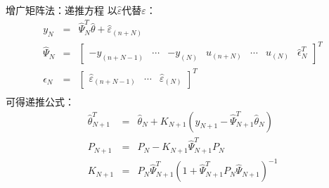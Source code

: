 \begin{frame}{增广矩阵法：递推方程}
以$\hat\varepsilon$代替$\varepsilon$：
\begin{eqnarray*}
y_{N} &=& \hat \Psi_N^T\hat\theta +\hat\varepsilon_{(n+N)} \\
\hat\Psi_N &=&\begin{bmatrix}-y_{(n+N-1)} & \cdots & -y_{(N)} & u_{(n+N)} &\cdots & u_{(N)} & \hat\epsilon_N^T \end{bmatrix}^T \\
\hat\epsilon_N &=&\begin{bmatrix} \hat\varepsilon_{(n+N-1)} & \cdots & \hat\varepsilon_{(N)} \end{bmatrix}^T \\
\end{eqnarray*}
可得递推公式：
\begin{eqnarray*}
\hat\theta_{N+1}^T &=& \hat\theta_N + K_{N+1} (y_{N+1}-\hat\Psi_{N+1}^T\hat\theta_N) \\
P_{N+1} &=& P_N -K_{N+1}\hat\Psi_{N+1}^T P_N \\
K_{N+1} &=& P_N \hat\Psi_{N+1}^T (1+\hat\Psi_{N+1}^T P_N \hat\Psi_{N+1})^{-1}
\end{eqnarray*}
\end{frame}



